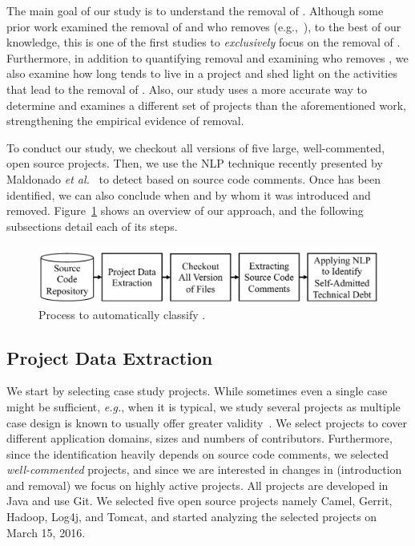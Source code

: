 The main goal of our study is to understand the removal of \SATD.  Although some prior work examined the removal of \SATD and who removes \SATD (e.g.,~\cite{Potdar2014ICSME,Bavota2016MSR}), to the best of our knowledge, this is one of the first studies to \emph{exclusively} focus on the removal of \SATD. Furthermore, in addition to quantifying removal and examining who removes \SATD, we also examine how long \SATD tends to live in a project and shed light on the activities that lead to the removal of \SATD. Also, our study uses a more accurate way to determine \SATD and examines a different set of projects than the aforementioned work, strengthening the empirical evidence of \SATD removal.



To conduct our study, we checkout all versions of five large, well-commented, open source projects. Then, we use the NLP technique recently presented by Maldonado \emph{et al.}~\cite{Maldonado2015TSE} to detect \SATD based on source code comments. Once \SATD has been identified, we can also conclude when and by whom it was introduced and removed.
Figure~\ref{fig:automatically_classified_data_approach_overview} shows an overview of our approach, and the following subsections detail each of its steps.


\begin{figure}[tb!]
	\centering
	\includegraphics[width=\columnwidth]{approach.pdf}
	\caption{Process to automatically classify \SATD.}
	\label{fig:automatically_classified_data_approach_overview}
\end{figure}

\subsection{Project Data Extraction}
\label{sub:project_data_extraction}
We start by selecting case study projects. While sometimes even a single case might be sufficient, \emph{e.g.}, when it is typical, we study several projects as multiple case design is known to usually offer greater validity~\cite{Easterbrook2008}.
We select projects to cover different application domains, sizes and numbers of contributors. Furthermore, since the \SATD identification heavily depends on source code comments, we selected \emph{well-commented} projects, and since we are interested in changes in \SATD (introduction and removal) we focus on highly active projects. 
All projects are developed in Java and use Git. We selected five open source projects namely Camel, Gerrit, Hadoop, Log4j, and Tomcat, and started analyzing the selected projects on March 15, 2016.



